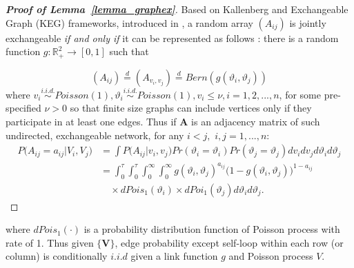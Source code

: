 \documentclass[12pt]{article}
\theoremstyle{definition}
\begin{document}
	
\begin{proof}[\textbf{Proof of Lemma~\ref{lemma_graphex}}]
	Based on Kallenberg and Exchangeable Graph (KEG) frameworks, introduced in \cite{veitch2015class}, a random array $(A_{ij})$ is jointly exchangeable \textit{if and only if} it can be represented as follows : there is a random function $g : \mathbb{R}^{2}_{+} \rightarrow [0,1]$ such that 
	
	\begin{equation}
	(A_{ij})  \stackrel{d}{=} (A_{v_{i}, v_{j}} )  \stackrel{d}{=} Bern( g( \vartheta_{i}, \vartheta_{j}))
	\end{equation}
	where $v_{i} \overset{i.i.d.}{\sim} Poisson(1), \vartheta_{i} \overset{i.i.d.}{\sim} Poisson(1), v_{i} \leq \nu, i = 1,2,... , n$, for some pre-specified $\nu >0$ so that finite size graphs can include vertices only if they participate in at least one edges. Thus if $\mathbf{A}$ is an adjacency matrix of such undirected, exchangeable network, for any $i < j,$ $i,j = 1,... , n$:
\begin{equation}
\begin{split}
	P \big(  A_{ij} = a_{ij} \big| V_{i}, V_{j} \big) & = \int P \big( A_{ij} \big| v_{i}, v_{j} \big) Pr(\vartheta_{i} = \vartheta_{i}) Pr(\vartheta_{j} = \vartheta_{j})   dv_{i} dv_{j} d\vartheta_{i} d\vartheta_{j}   \\ & = \int_{0}^{\tau} \int_{0}^{\tau}   \int_{0}^{\infty} \int_{0}^{\infty}  g( \vartheta_{i},  \vartheta_{j})^{a_{ij}} \big( 1- g( \vartheta_{i},  \vartheta_{j}) \big)^{1-a_{ij}}  \\ & \quad \times dPois_{1}(\vartheta_{i}) \times dPoi_{1}(\vartheta_{j})  d \vartheta_{i} d \vartheta_{j}.
\end{split}
\end{equation}
\end{proof}
where $dPois_{1}(\cdot)$ is a probability distribution function of Poisson process with rate of 1.  Thus given $\{ \mathbf{V} \}$, edge probability except self-loop within each row (or column) is conditionally $\textit{i.i.d}$ given a link function $g$ and Poisson process $V$.
\end{document}
